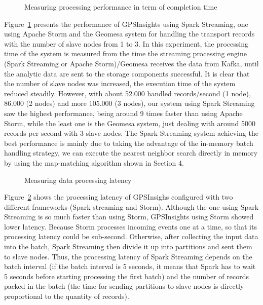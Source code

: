 \documentclass{acm_proc_article-sp}
\begin{document}
	
	\begin{figure}[h]
		\centering
		\caption{Measuring processing performance in term of completion time}
		\label{fig:performance}
	\end{figure}

Figure~\ref{fig:performance} presents the performance of GPSInsights using Spark Streaming, one using Apache Storm and the Geomesa system for handling the transport records with the number of slave nodes from 1 to 3. In this experiment, the processing time of the system is measured from the time the streaming processing engine (Spark Streaming or Apache Storm)/Geomesa receives the data from Kafka, until the analytic data are sent to the storage components successful. It is clear that the number of slave nodes was increased, the execution time of the system reduced steadily. However, with about 52.000 handled records/second (1 node), 86.000 (2 nodes) and more 105.000 (3 nodes), our system using Spark Streaming saw the highest performance, being around 9 times faster than using Apache Storm, while the least one is the Geomesa system, just dealing with around 5000 records per second with 3 slave nodes. The Spark Streaming system achieving the best performance is mainly due to taking the advantage of the in-memory batch handling strategy, we can execute the nearest neighbor search directly in memory by using the map-matching algorithm shown in Section 4.

	\begin{figure}[h]
		\centering
		\caption{Measuring data processing latency}
		\label{fig:timedelay}
	\end{figure}
	
Figure~\ref{fig:timedelay} shows the processing latency of GPSInsighs configured with two different frameworks (Spark streaming and Storm). Although the one using Spark Streaming is so much faster than using Storm, GPSInsights using Storm showed lower latency. Because Storm processes incoming events one at a time, so that its processing latency could be sub-second. Otherwise, after collecting the input data into the batch, Spark Streaming then divide it up into partitions and sent them to slave nodes. Thus, the processing latency of Spark Streaming depends on the batch interval (if the batch interval is 5 seconds, it means that Spark has to wait 5 seconds before starting processing the first batch) and the number of records packed in the batch (the time for sending partitions to slave nodes is directly proportional to the quantity of records).
\end{document}
